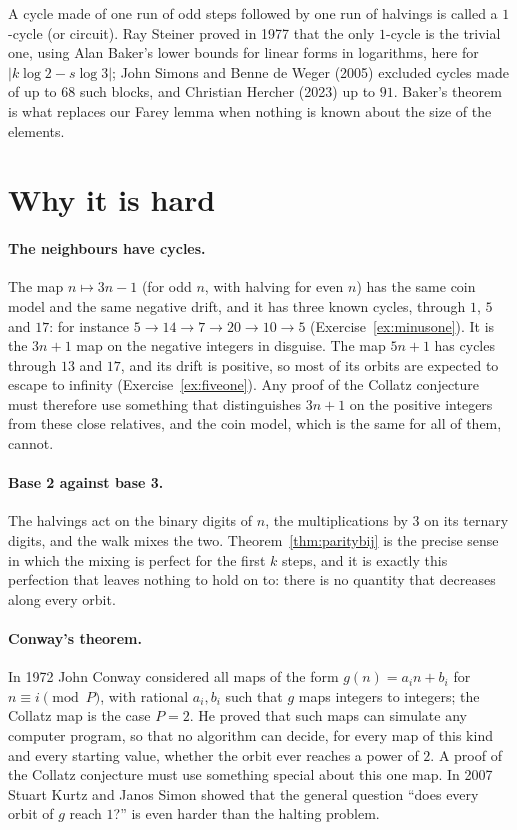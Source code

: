 \begin{remark}\label{rem:mcycles}
A cycle made of one run of odd steps followed by one run of halvings is called a $1$-cycle (or circuit). Ray Steiner proved in 1977 that the only
$1$-cycle is the trivial one, using Alan Baker's lower bounds for linear forms in logarithms, here for $|k\log2-s\log3|$; John Simons and Benne de
Weger (2005) excluded cycles made of up to $68$ such blocks, and Christian Hercher (2023) up to $91$. Baker's theorem is what replaces our Farey lemma
when nothing is known about the size of the elements.
\end{remark}

\section{Why it is hard}

\paragraph{The neighbours have cycles.} The map $n\mapsto3n-1$ (for odd $n$, with halving for even $n$) has the same coin model and the same negative
drift, and it has three known cycles, through $1$, $5$ and $17$: for instance $5\to14\to7\to20\to10\to5$ (Exercise~\ref{ex:minusone}). It is the
$3n+1$ map on the negative integers in disguise. The map $5n+1$ has cycles through $13$ and $17$, and its drift is positive, so most of its orbits are
expected to escape to infinity (Exercise~\ref{ex:fiveone}). Any proof of the Collatz conjecture must therefore use something that distinguishes $3n+1$
on the positive integers from these close relatives, and the coin model, which is the same for all of them, cannot.

\paragraph{Base 2 against base 3.} The halvings act on the binary digits of $n$, the multiplications by $3$ on its ternary digits, and the walk mixes
the two. Theorem~\ref{thm:paritybij} is the precise sense in which the mixing is perfect for the first $k$ steps, and it is exactly this perfection that
leaves nothing to hold on to: there is no quantity that decreases along every orbit.

\paragraph{Conway's theorem.} In 1972 John Conway considered all maps of the form $g(n)=a_in+b_i$ for $n\equiv i\pmod P$, with rational $a_i,b_i$ such that
$g$ maps integers to integers; the Collatz map is the case $P=2$. He proved that such maps can simulate any computer program, so that no algorithm can
decide, for every map of this kind and every starting value, whether the orbit ever reaches a power of $2$. A proof of the Collatz conjecture must use
something special about this one map. In 2007 Stuart Kurtz and Janos Simon showed that the general question ``does every orbit of $g$ reach $1$?'' is
even harder than the halting problem.

